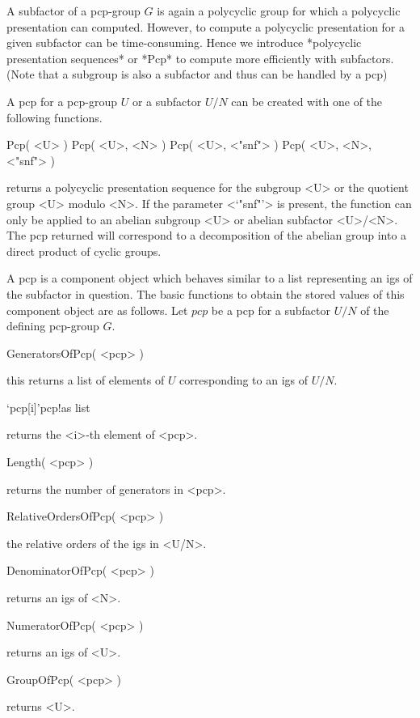 \label{pcps}

A subfactor of a pcp-group $G$ is again a polycyclic group for which a
polycyclic presentation can computed.  However, to compute a polycyclic
presentation for  a given subfactor  can  be time-consuming.  Hence we
introduce *polycyclic presentation sequences* or *Pcp* to compute more
efficiently with subfactors. (Note that a subgroup is also a subfactor 
and  thus can be handled by a pcp)

A pcp for a pcp-group $U$ or a subfactor $U /  N$ can be created with
one of the following functions.

\>Pcp( <U> )
\>Pcp( <U>, <N> )
\>Pcp( <U>, <"snf"> )
\>Pcp( <U>, <N>, <"snf"> )

returns a polycyclic presentation sequence for the subgroup <U> or the
quotient group  <U> modulo <N>.  If the  parameter <`"snf"'> is present,
the function can only be applied to an abelian  subgroup <U>  or abelian
subfactor   <U>/<N>.   The pcp  returned  will correspond     to a
decomposition of  the abelian  group  into a direct  product of cyclic
groups.

\bigskip
A  pcp   is  a component  object which    behaves similar  to   a list
representing an igs of the  subfactor in question. The basic functions
to   obtain  the  stored  values of  this     component object  are as
follows.  Let $pcp$  be a pcp  for  a subfactor $U/N$  of the defining
pcp-group $G$.

\>GeneratorsOfPcp( <pcp> )

this returns a list   of elements of $U$   corresponding to an  igs of
$U/N$.

\>`pcp[i]'{pcp}!{as list}

returns the <i>-th element of <pcp>.

\>Length( <pcp> )

returns the number of generators in <pcp>.

\>RelativeOrdersOfPcp( <pcp> )

the relative orders of the igs in <U/N>.

\>DenominatorOfPcp( <pcp> )

returns an igs of <N>. 

\>NumeratorOfPcp( <pcp> )

returns an igs of <U>.

\>GroupOfPcp( <pcp> )

returns <U>.

